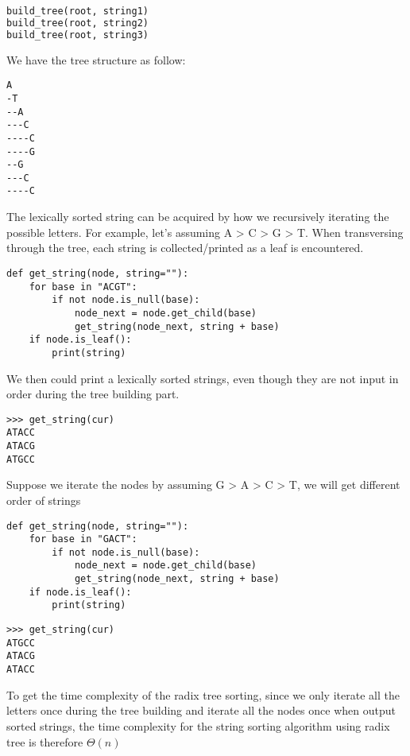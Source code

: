 \documentclass{article}
\begin{document}
\begin{enumerate}
\begin{enumerate}[label*=\arabic*.]
\begin{lstlisting}[language=Python]
build_tree(root, string1)
build_tree(root, string2)
build_tree(root, string3)
\end{lstlisting}

We have the tree structure as follow:
\begin{lstlisting}
A
-T
--A
---C
----C
----G
--G
---C
----C
\end{lstlisting}

The lexically sorted string can be acquired by how we recursively iterating the possible letters. For example, let's assuming A > C > G > T. When transversing through the tree, each string is collected/printed as a leaf is encountered.

\begin{lstlisting}
def get_string(node, string=""):
    for base in "ACGT":
        if not node.is_null(base):
            node_next = node.get_child(base)
            get_string(node_next, string + base)
    if node.is_leaf():
        print(string)
\end{lstlisting}

We then could print a lexically sorted strings, even though they are not input in order during the tree building part.

\begin{lstlisting}
>>> get_string(cur)
ATACC
ATACG
ATGCC
\end{lstlisting}

Suppose we iterate the nodes by assuming G > A > C > T, we will get different order of strings

\begin{lstlisting}
def get_string(node, string=""):
    for base in "GACT":
        if not node.is_null(base):
            node_next = node.get_child(base)
            get_string(node_next, string + base)
    if node.is_leaf():
        print(string)
\end{lstlisting}

\begin{lstlisting}
>>> get_string(cur)
ATGCC
ATACG
ATACC
\end{lstlisting}

To get the time complexity of the radix tree sorting, since we only iterate all the letters once during the tree building and iterate all the nodes once when output sorted strings, the time complexity for the string sorting algorithm using radix tree is therefore $\Theta(n)$

\gap
\end{enumerate}


\end{enumerate}
\end{document}
